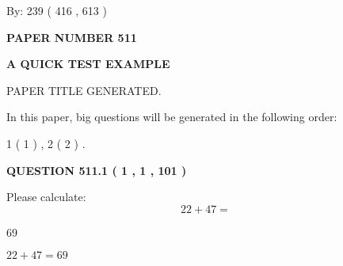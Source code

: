 \documentclass[12pt]{article}
\begin{document}
   
\hspace{1.0in} By: 
 239 ( 416 ,  613 )
   
   
   
   
\newpage 
\setcounter{page}{ 
   511001 } 
   
   
   
   
 {\textbf{ \Large{ PAPER NUMBER  511  }}}
   
   
\vspace{0.2in}
   
   
   
   
   
   
   
   
 \vspace{0.2in}
{\LARGE {\textbf{ A QUICK TEST EXAMPLE}}}
   
   
 PAPER TITLE GENERATED.
   
   
   
\vspace{0.2in}
   
In this paper, big questions will be generated in the following order: 
   
   
   1 ( 1 )
 ,
   2 ( 2 )
 .
  
\vspace{0.2in}
  
{\textbf{\Large{QUESTION
511.1 
 ( 1 , 1 , 101 )
}}}
  
  
 
Please calculate:
\begin{equation}
22 +  %
47 = \nonumber
\end{equation}
 
 
 
\noindent{}
 
 

69
 
 
\noindent{}
 
 

 
 
 
\noindent{}
 
 

$ %
22 +  %
47=   %
69$
 
 
\noindent{}
 
\end{document}
